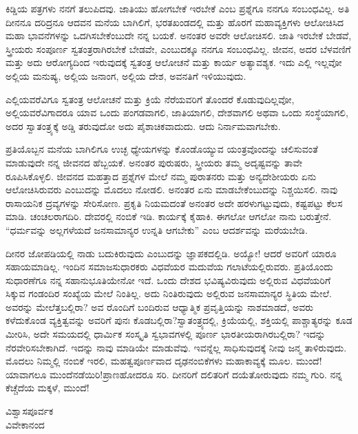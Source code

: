 ಕಿಡ್ಡಿಯ ಪತ್ರಗಳು ನನಗೆ ತಲುಪಿದವು. ಜಾತಿಯು ಹೋಗಬೇಕೆ ಇರಬೇಕೆ ಎಂಬ ಪ್ರಶ್ನೆಗೂ ನನಗೂ ಸಂಬಂಧವಿಲ್ಲ. ಅತಿ ದೀನನೂ ದರಿದ್ರನೂ ಆದವನ ಮನೆಯ ಬಾಗಿಲಿಗೆ, ಭರತಖಂಡದಲ್ಲಿ ಮತ್ತು ಹೊರಗೆ ಮಹಾವ್ಯಕ್ತಿಗಳು ಆಲೋಚಿಸಿದ ಮಹಾ ಭಾವನೆಗಳನ್ನು ಒದಗಿಸಬೇಕೆಂಬುದೇ ನನ್ನ ಬಯಕೆ. ಅನಂತರ ಅವರೇ ಆಲೋಚಿಸಲಿ. ಜಾತಿ ಇರಬೇಕೆ ಬೇಡವೆ, ಸ್ತ್ರೀಯರು ಸಂಪೂರ್ಣ ಸ್ವತಂತ್ರರಾಗಿರಬೇಕೆ ಬೇಡವೇ, ಎಂಬುದಕ್ಕೂ ನನಗೂ ಸಂಬಂಧವಿಲ್ಲ. ಜೀವನ, ಅದರ ಬೆಳವಣಿಗೆ ಮತ್ತು ಅದು ಆರೋಗ್ಯದಿಂದ ಇರುವುದಕ್ಕೆ ಸ್ವತಂತ್ರ ಆಲೋಚನೆ ಮತ್ತು ಕಾರ್ಯ ಅತ್ಯಾವಶ್ಯಕ. ಇದು ಎಲ್ಲಿ ಇಲ್ಲವೋ ಅಲ್ಲಿಯ ಮನುಷ್ಯ, ಅಲ್ಲಿಯ ಜನಾಂಗ, ಅಲ್ಲಿಯ ದೇಶ, ಅವನತಿಗೆ ಇಳಿಯುವುದು.

ಎಲ್ಲಿಯವರೆವಿಗೂ ಸ್ವತಂತ್ರ ಆಲೋಚನೆ ಮತ್ತು ಕ್ರಿಯೆ ನೆರೆಯವರಿಗೆ ತೊಂದರೆ ಕೊಡುವುದಿಲ್ಲವೋ, ಅಲ್ಲಿಯವರೆವಿಗಾದರೂ ಯಾವ ಒಂದು ಪಂಗಡವಾಗಲಿ, ಜಾತಿಯಾಗಲಿ, ದೇಶವಾಗಲಿ ಅಥವಾ ಒಂದು ಸಂಸ್ಥೆಯಾಗಲಿ, ಅದರ ಸ್ವಾತಂತ್ರ್ಯಕ್ಕೆ ಅಡ್ಡಿ ತರುವುದೋ ಅದು ಪೈಶಾಚಿಕವಾದುದು. ಆದು ನಿರ್ನಾಮವಾಗಬೇಕು.

ಪ್ರತಿಯೊಬ್ಬನ ಮನೆಯ ಬಾಗಿಲಿಗೂ ಉಚ್ಛ ಧ್ಯೇಯಗಳನ್ನು ಕೊಂಡೊಯ್ಯುವ ಯಂತ್ರವೊಂದನ್ನು ಚಲಿಸುವಂತೆ ಮಾಡುವುದೇ ನನ್ನ ಜೀವನದ ಹೆಬ್ಬಯಕೆ. ಅನಂತರ ಪುರುಷರು, ಸ್ತ್ರೀಯರು ತಮ್ಮ ಅದೃಷ್ಟವನ್ನು ತಾವೇ ರೂಪಿಸಿಕೊಳ್ಳಲಿ. ಜೀವನದ ಮಹತ್ತಾದ ಪ್ರಶ್ನೆಗಳ ಮೇಲೆ ನಮ್ಮ ಪುರಾತನರು ಮತ್ತು ಅನ್ಯದೇಶೀಯರು ಏನು ಆಲೋಚಿಸಿರುವರು ಎಂಬುದನ್ನು ಮೊದಲು ನೋಡಲಿ. ಅನಂತರ ಏನು ಮಾಡಬೇಕೆಂಬುದನ್ನು ನಿಶ್ಚಯಿಸಲಿ. ನಾವು ರಾಸಾಯನಿಕ ದ್ರವ್ಯಗಳನ್ನು ಸೇರಿಸೋಣ. ಪ್ರಕೃತಿ ನಿಯಮದಂತೆ ಅನಂತರ ಅದೇ ಹರಳುಗಟ್ಟುವುದು, ಕಷ್ಟಪಟ್ಟು ಕೆಲಸ ಮಾಡಿ. ಚಂಚಲರಾಗದಿರಿ. ದೇವರಲ್ಲಿ ನಂಬಿಕೆ ಇಡಿ. ಕಾರ್ಯಕ್ಕೆ ಕೈಹಾಕಿ. ಈಗಲೋ ಆಗಲೋ ನಾನು ಬರುತ್ತೇನೆ. “ಧರ್ಮವನ್ನು ಅಲ್ಲಗಳೆಯದೆ ಜನಸಾಮಾನ್ಯರ ಉನ್ನತಿ ಆಗಬೇಕು” ಎಂಬ ಆದರ್ಶವನ್ನು ಮರೆಯಬೇಡಿ.

ದೀನರ ಜೋಪಡಿಯಲ್ಲಿ ನಾಡು ಬದುಕಿರುವುದು ಎಂಬುದನ್ನು ಜ್ಞಾಪಕದಲ್ಲಿಡಿ. ಅಯ್ಯೋ! ಆದರೆ ಅವರಿಗೆ ಯಾರೂ ಸಹಾಯಮಾಡಿಲ್ಲ. ಇಂದಿನ ಸಮಾಜಸುಧಾರಕರು ವಿಧವೆಯರ ಮದುವೆಯ ಗಲಾಟೆಯಲ್ಲಿರುವರು. ಪ್ರತಿಯೊಂದು ಸುಧಾರಣೆಗೂ ನನ್ನ ಸಹಾನುಭೂತಿಯೇನೋ ಇದೆ. ಒಂದು ದೇಶದ ಭವಿಷ್ಯವಿರುವುದು ಅಲ್ಲಿರುವ ವಿಧವೆಯರಿಗೆ ಸಿಕ್ಕುವ ಗಂಡಂದಿರ ಸಂಖ್ಯೆಯ ಮೇಲೆ ನಿಂತಿಲ್ಲ. ಅದು ನಿಂತಿರುವುದು ಅಲ್ಲಿರುವ ಜನಸಾಮಾನ್ಯರ ಸ್ಥಿತಿಯ ಮೇಲೆ. ಅವರನ್ನು ಮೇಲೆತ್ತಬಲ್ಲಿರಾ? ಅವ ರೊಂದಿಗೆ ಬಂದಿರುವ ಆಧ್ಯಾತ್ಮಿಕ ಪ್ರವೃತ್ತಿಯನ್ನು ನಾಶಮಾಡದೆ, ಅವರು ಕಳೆದುಕೊಂಡ ವ್ಯಕ್ತಿತ್ವವನ್ನು ಅವರಿಗೆ ಪುನಃ ಕೊಡಬಲ್ಲಿರಾ?ಸ್ವಾತಂತ್ರ್ಯದಲ್ಲಿ, ಕ್ರಿಯೆಯಲ್ಲಿ, ಶಕ್ತಿಯಲ್ಲಿ ಪಾಶ್ಚಾತ್ಯರನ್ನು ಕೂಡ ಮೀರಿಸಿ, ಅದೇ ಸಮಯದಲ್ಲಿ ಧಾರ್ಮಿಕ ಸಂಸ್ಕೃತಿ ಸ್ವಭಾವಗಳಲ್ಲಿ ಪೂರ್ಣ ಭಾರತೀಯರಾಗಿರಬಲ್ಲಿರಾ? ಇದನ್ನು ನೆರವೇರಿಸಬೇಕಾಗಿದೆ. ಇದನ್ನು ನಾವು ಮಾಡಿಯೇ ಮಾಡುವೆವು. ಇವನ್ನೆಲ್ಲ ಸಾಧಿಸುವುದಕ್ಕೆ ನೀವು ಜನ್ಮ ತಾಳಿರುವುದು. ಮೊದಲು ನಿಮ್ಮಲ್ಲಿ ನಂಬಿಕೆ ಇರಲಿ, ಮಹತ್ವಪೂರ್ಣವಾದ ದೃಢನಂಬಿಕೆಗಳು ಮಹಾಕಾವ್ಯಕ್ಕೆ ಮೂಲ. ಮುಂದೆ!\break ಯಾವಾಗಲೂ ಮುಂದೆನಡೆಯಿರಿ!ಪ್ರಾಣಹೋದರೂ ಸರಿ. ದೀನರಿಗೆ ದಲಿತರಿಗೆ ದಯೆತೋರುವುದು ನಮ್ಮ ಗುರಿ. ನನ್ನ ಕೆಚ್ಚೆದೆಯ ಮಕ್ಕಳೆ, ಮುಂದೆ!

\vspace{-0.5cm}

\begin{flushright}
ವಿಶ್ವಾಸಪೂರ್ವಕ\\ವಿವೇಕಾನಂದ
\end{flushright}

